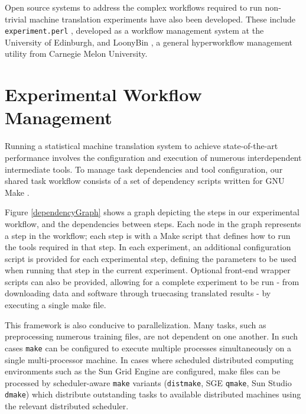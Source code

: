 \documentclass[11pt]{article}
\begin{document}
Open source systems to address the complex workflows required to run non-trivial machine translation experiments have also been developed. These include {\tt experiment.perl} \cite{experiment.perl}, developed as a workflow management system at the University of Edinburgh, and LoonyBin \cite{LoonyBin}, a general hyperworkflow management utility from Carnegie Melon University.







\section{Experimental Workflow Management}
\label{Framework}


Running a statistical machine translation system to achieve state-of-the-art performance involves the configuration and execution of numerous interdependent intermediate tools. To manage task dependencies and tool configuration, our shared task workflow consists of a set of dependency scripts written for GNU Make \cite{gnumake}. 

Figure \ref{dependencyGraph} shows a graph depicting the steps in our experimental workflow, and the dependencies between steps. Each node in the graph represents a step in the workflow; each step is with a Make script that defines how to run the tools required in that step. In each experiment, an additional configuration script is provided for each experimental step, defining the parameters to be used when running that step in the current experiment. Optional front-end wrapper scripts can also be provided, allowing for a complete experiment to be run - from downloading data and software through truecasing translated results - by executing a single make file.

This framework is also conducive to parallelization. Many tasks, such as preprocessing numerous training files, are not dependent on one another. In such cases {\tt make} can be configured to execute multiple processes simultaneously on a single multi-processor machine. In cases where scheduled distributed computing environments such as the Sun Grid Engine are configured, make files can be processed by scheduler-aware {\tt make} variants ({\tt distmake}, SGE {\tt qmake}, Sun Studio {\tt dmake}) which distribute outstanding tasks to available distributed machines using the relevant distributed scheduler.
\end{document}
